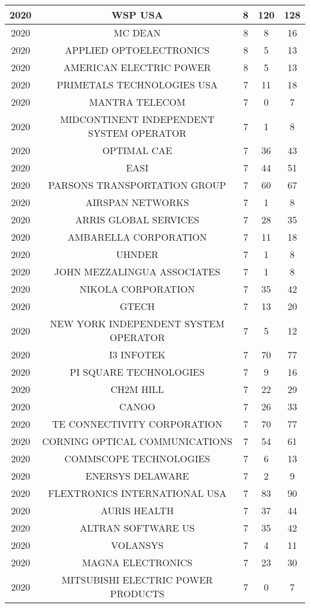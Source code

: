 \documentclass{article}%
\begin{document}
\begin{longtable}{c|c|c|c|c}
\hline%
2020&WSP USA&8&120&128\\%
\hline%
2020&MC DEAN&8&8&16\\%
\hline%
2020&APPLIED OPTOELECTRONICS&8&5&13\\%
\hline%
2020&AMERICAN ELECTRIC POWER&8&5&13\\%
\hline%
2020&PRIMETALS TECHNOLOGIES USA&7&11&18\\%
\hline%
2020&MANTRA TELECOM&7&0&7\\%
\hline%
2020&MIDCONTINENT INDEPENDENT SYSTEM OPERATOR&7&1&8\\%
\hline%
2020&OPTIMAL CAE&7&36&43\\%
\hline%
2020&EASI&7&44&51\\%
\hline%
2020&PARSONS TRANSPORTATION GROUP&7&60&67\\%
\hline%
2020&AIRSPAN NETWORKS&7&1&8\\%
\hline%
2020&ARRIS GLOBAL SERVICES&7&28&35\\%
\hline%
2020&AMBARELLA CORPORATION&7&11&18\\%
\hline%
2020&UHNDER&7&1&8\\%
\hline%
2020&JOHN MEZZALINGUA ASSOCIATES&7&1&8\\%
\hline%
2020&NIKOLA CORPORATION&7&35&42\\%
\hline%
2020&GTECH&7&13&20\\%
\hline%
2020&NEW YORK INDEPENDENT SYSTEM OPERATOR&7&5&12\\%
\hline%
2020&I3 INFOTEK&7&70&77\\%
\hline%
2020&PI SQUARE TECHNOLOGIES&7&9&16\\%
\hline%
2020&CH2M HILL&7&22&29\\%
\hline%
2020&CANOO&7&26&33\\%
\hline%
2020&TE CONNECTIVITY CORPORATION&7&70&77\\%
\hline%
2020&CORNING OPTICAL COMMUNICATIONS&7&54&61\\%
\hline%
2020&COMMSCOPE TECHNOLOGIES&7&6&13\\%
\hline%
2020&ENERSYS DELAWARE&7&2&9\\%
\hline%
2020&FLEXTRONICS INTERNATIONAL USA&7&83&90\\%
\hline%
2020&AURIS HEALTH&7&37&44\\%
\hline%
2020&ALTRAN SOFTWARE US&7&35&42\\%
\hline%
2020&VOLANSYS&7&4&11\\%
\hline%
2020&MAGNA ELECTRONICS&7&23&30\\%
\hline%
2020&MITSUBISHI ELECTRIC POWER PRODUCTS&7&0&7\\%

\end{longtable}
\end{document}
